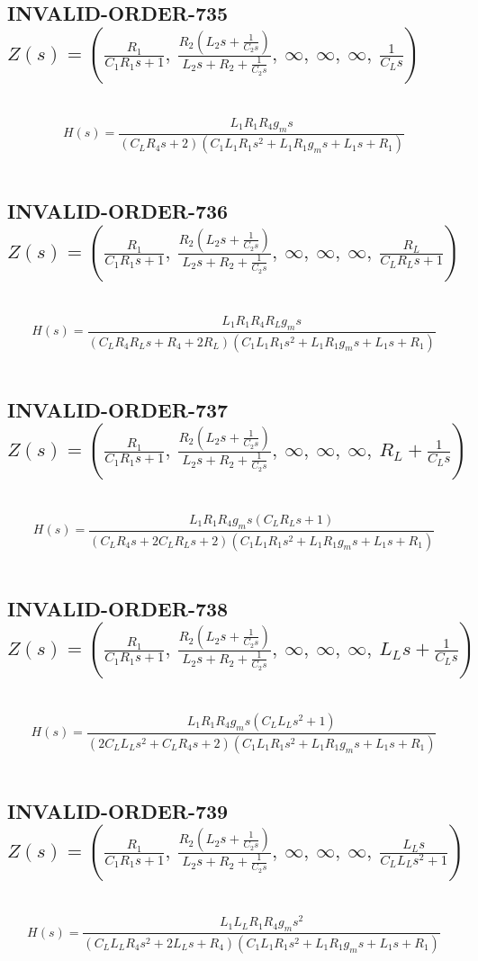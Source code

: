 \documentclass{article}
\begin{document}
\subsection{INVALID-ORDER-735 $Z(s) = \left( \frac{R_{1}}{C_{1} R_{1} s + 1}, \  \frac{R_{2} \left(L_{2} s + \frac{1}{C_{2} s}\right)}{L_{2} s + R_{2} + \frac{1}{C_{2} s}}, \  \infty, \  \infty, \  \infty, \  \frac{1}{C_{L} s}\right)$ } \ 
\textbf{\[H(s) = \frac{L_{1} R_{1} R_{4} g_{m} s}{\left(C_{L} R_{4} s + 2\right) \left(C_{1} L_{1} R_{1} s^{2} + L_{1} R_{1} g_{m} s + L_{1} s + R_{1}\right)}\] } \ 
\subsection{INVALID-ORDER-736 $Z(s) = \left( \frac{R_{1}}{C_{1} R_{1} s + 1}, \  \frac{R_{2} \left(L_{2} s + \frac{1}{C_{2} s}\right)}{L_{2} s + R_{2} + \frac{1}{C_{2} s}}, \  \infty, \  \infty, \  \infty, \  \frac{R_{L}}{C_{L} R_{L} s + 1}\right)$ } \ 
\textbf{\[H(s) = \frac{L_{1} R_{1} R_{4} R_{L} g_{m} s}{\left(C_{L} R_{4} R_{L} s + R_{4} + 2 R_{L}\right) \left(C_{1} L_{1} R_{1} s^{2} + L_{1} R_{1} g_{m} s + L_{1} s + R_{1}\right)}\] } \ 
\subsection{INVALID-ORDER-737 $Z(s) = \left( \frac{R_{1}}{C_{1} R_{1} s + 1}, \  \frac{R_{2} \left(L_{2} s + \frac{1}{C_{2} s}\right)}{L_{2} s + R_{2} + \frac{1}{C_{2} s}}, \  \infty, \  \infty, \  \infty, \  R_{L} + \frac{1}{C_{L} s}\right)$ } \ 
\textbf{\[H(s) = \frac{L_{1} R_{1} R_{4} g_{m} s \left(C_{L} R_{L} s + 1\right)}{\left(C_{L} R_{4} s + 2 C_{L} R_{L} s + 2\right) \left(C_{1} L_{1} R_{1} s^{2} + L_{1} R_{1} g_{m} s + L_{1} s + R_{1}\right)}\] } \ 
\subsection{INVALID-ORDER-738 $Z(s) = \left( \frac{R_{1}}{C_{1} R_{1} s + 1}, \  \frac{R_{2} \left(L_{2} s + \frac{1}{C_{2} s}\right)}{L_{2} s + R_{2} + \frac{1}{C_{2} s}}, \  \infty, \  \infty, \  \infty, \  L_{L} s + \frac{1}{C_{L} s}\right)$ } \ 
\textbf{\[H(s) = \frac{L_{1} R_{1} R_{4} g_{m} s \left(C_{L} L_{L} s^{2} + 1\right)}{\left(2 C_{L} L_{L} s^{2} + C_{L} R_{4} s + 2\right) \left(C_{1} L_{1} R_{1} s^{2} + L_{1} R_{1} g_{m} s + L_{1} s + R_{1}\right)}\] } \ 
\subsection{INVALID-ORDER-739 $Z(s) = \left( \frac{R_{1}}{C_{1} R_{1} s + 1}, \  \frac{R_{2} \left(L_{2} s + \frac{1}{C_{2} s}\right)}{L_{2} s + R_{2} + \frac{1}{C_{2} s}}, \  \infty, \  \infty, \  \infty, \  \frac{L_{L} s}{C_{L} L_{L} s^{2} + 1}\right)$ } \ 
\textbf{\[H(s) = \frac{L_{1} L_{L} R_{1} R_{4} g_{m} s^{2}}{\left(C_{L} L_{L} R_{4} s^{2} + 2 L_{L} s + R_{4}\right) \left(C_{1} L_{1} R_{1} s^{2} + L_{1} R_{1} g_{m} s + L_{1} s + R_{1}\right)}\] } \ 
\end{document}
